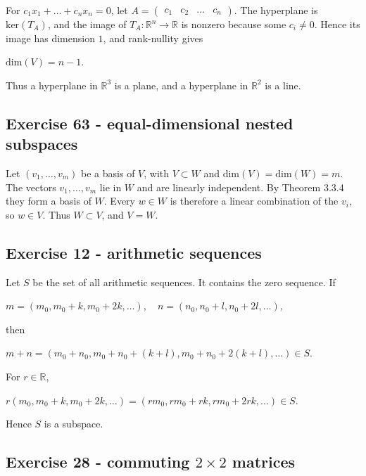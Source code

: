 For \(c_{1}x_{1} + \ldots + c_{n}x_{n} = 0\), let \(A = \begin{pmatrix}
c_{1} & c_{2} & \ldots & c_{n}
\end{pmatrix}\). The hyperplane is \(\text{ker}\left( T_{A} \right)\), and the image of \(T_{A}:\mathbb{R}^{n}\rightarrow\mathbb{R}\) is nonzero because some \(c_{i} \neq 0\). Hence its image has dimension \(1\), and rank-nullity gives

\(\text{dim}(V) = n - 1.\)

Thus a hyperplane in \(\mathbb{R}^{3}\) is a plane, and a hyperplane in \(\mathbb{R}^{2}\) is a line.

\subsection{Exercise 63 - equal-dimensional nested subspaces}

Let \(\left( {v_{1},\ldots,v_{m}} \right)\) be a basis of \(V\), with \(V \subset W\) and \(\text{dim}(V) = \text{dim}(W) = m\). The vectors \(v_{1},\ldots,v_{m}\) lie in \(W\) and are linearly independent. By Theorem 3.3.4 they form a basis of \(W\). Every \(w \in W\) is therefore a linear combination of the \(v_{i}\), so \(w \in V\). Thus \(W \subset V\), and \(V = W\).

\subsection{Exercise 12 - arithmetic sequences}

Let \(S\) be the set of all arithmetic sequences. It contains the zero sequence. If

\(m = \left( {m_{0},m_{0} + k,m_{0} + 2k,\ldots} \right),\quad n = \left( {n_{0},n_{0} + l,n_{0} + 2l,\ldots} \right),\)

then

\(m + n = \left( {m_{0} + n_{0},m_{0} + n_{0} + \left( {k + l} \right),m_{0} + n_{0} + 2\left( {k + l} \right),\ldots} \right) \in S.\)

For \(r \in \mathbb{R}\),

\(r\left( {m_{0},m_{0} + k,m_{0} + 2k,\ldots} \right) = \left( {rm_{0},rm_{0} + rk,rm_{0} + 2rk,\ldots} \right) \in S.\)

Hence \(S\) is a subspace.

\subsection{\texorpdfstring{Exercise 28 - commuting \(2 \times 2\) matrices}{Exercise 28 - commuting 2 \textbackslash times 2 matrices}}

